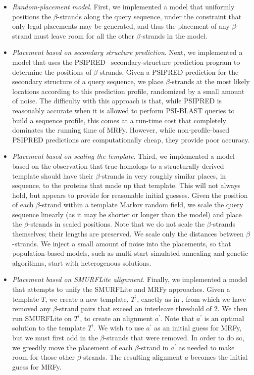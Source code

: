 \documentclass{acm_proc_article-sp}
\begin{document}
\begin{itemize}
  \item \emph{Random-placement model}.
  First, we implemented a model that uniformly positions the $\beta$-strands
  along the query sequence, under the constraint that only legal placements
  may be generated, and thus the placement of any $\beta$-strand must leave 
  room for all the other $\beta$-strands in the model.
  
  \item \emph{Placement based on secondary structure prediction}.
  Next, we implemented a model that uses the PSIPRED~\cite{McGuffin:2000wx} secondary-structure
  prediction program to determine the positions of $\beta$-strands.
  Given a PSIPRED prediction for the secondary structure of a query sequence,
  we place $\beta$-strands at the most likely locations according to this
  prediction profile, randomized by a small amount of noise.
  The difficulty with this approach is that, while PSIPRED is reasonably 
  accurate when it is allowed to perform PSI-BLAST\cite{Altschul:1997tl} 
  queries to build a sequence
  profile, this comes at a run-time cost that completely dominates the running
  time of MRFy.
  However, while non-profile-based PSIPRED predictions are computationally 
  cheap, they provide poor accuracy.
  
  \item \emph{Placement based on scaling the template}.
  Third, we implemented a model based on the observation that true homologs
  to a structurally-derived template should have their $\beta$-strands in very
  roughly similar places, in sequence, to the proteins that made up that
  template.
  This will not always hold, but appears to provide for reasonable initial
  guesses.
  Given the position of each $\beta$-strand within a template Markov random 
  field, we scale the query sequence linearly (as it may be shorter or longer 
  than the model) and place the $\beta$-strands in scaled positions.
  Note that we do not scale the $\beta$-strands themselves; their lengths are
  preserved.
  We scale only the distances between $\beta$-strands.
  We inject a small amount of noise into the placements, so that 
  population-based models, such as multi-start simulated annealing and genetic
  algorithms, start with heterogenous solutions.
  
  \item \emph{Placement based on SMURFLite alignment}.
  Finally, we implemented a model that attempts to unify the SMURFLite and
  MRFy approaches.
  Given a template $T$, we create a new template, $T^\prime$, exactly as in
  \citet{Daniels:2012dg}, from which we have removed any $\beta$-strand pairs
  that exceed an interleave threshold of 2.
  We then run SMURFLite on $T^\prime$, to create an alignment $a^\prime$.
  Note that $a^\prime$ is an optimal solution to the template $T^\prime$.
  We wish to use $a^\prime$ as an initial guess for MRFy, but we must first add
  in the $\beta$-strands that were removed.
  In order to do so, we greedily move the placement of each $\beta$-strand in
  $a^\prime$ as needed to make room for those other $\beta$-strands.
  The resulting alignment $a$ becomes the initial guess for MRFy.
  

\end{itemize}
\end{document}
